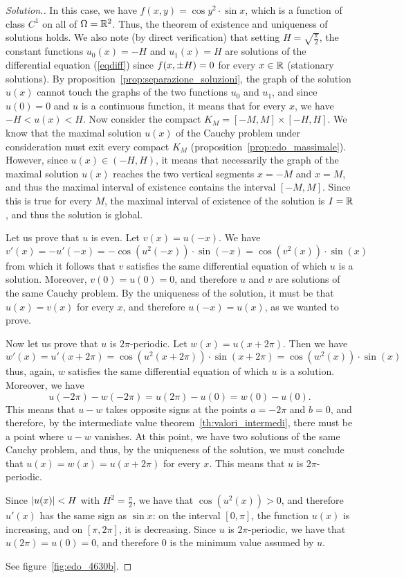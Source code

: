 \begin{proof}[Solution.]
In this case, we have $f(x,y)=\cos y^2\cdot \sin x$, which is a function of
class $C^1$ on all of $\Omega={\mathbb R}^2$. Thus, the theorem of existence and
uniqueness of solutions holds. We also note (by direct verification) that
setting $H=\sqrt{\frac \pi 2}$, the constant functions $u_0(x)=-H$ and
$u_1(x)=H$ are solutions of the differential equation (\ref{eqdiff}) since
$f{\left( x,\pm H \right)}=0$ for every $x\in {\mathbb R}$ (stationary solutions). By
proposition~\ref{prop:separazione_soluzioni}, the graph of the solution $u(x)$
cannot touch the graphs of the two functions $u_0$ and $u_1$, and since $u(0)=0$
and $u$ is a continuous function, it means that for every $x$, we have $-H <
u(x) < H$. Now consider the compact $K_M=[-M,M] \times [-H,H]$. We know that the
maximal solution $u(x)$ of the Cauchy problem under consideration must exit
every compact $K_M$ (proposition~\ref{prop:edo_massimale}). However, since
$u(x)\in (-H,H)$, it means that necessarily the graph of the maximal solution
$u(x)$ reaches the two vertical segments $x=-M$ and $x=M$, and thus the maximal
interval of existence contains the interval $[-M,M]$. Since this is true for
every $M$, the maximal interval of existence of the solution is $I={\mathbb R}$, and
thus the solution is global.

Let us prove that $u$ is even. Let $v(x)=u(-x)$. We have 
\[ 
    v'(x) = -u'(-x) 
    = -\cos(u^2(-x))\cdot \sin(-x) 
    = \cos(v^2(x))\cdot \sin(x)
\]
from which it follows that $v$ satisfies the same differential equation of which
$u$ is a solution. Moreover, $v(0)=u(0)=0$, and therefore $u$ and $v$ are
solutions of the same Cauchy problem. By the uniqueness of the solution, it must
be that $u(x)=v(x)$ for every $x$, and therefore $u(-x)=u(x)$, as we wanted to
prove.

Now let us prove that $u$ is $2\pi$-periodic. Let $w(x)=u(x+2\pi)$. Then we have
\[
  w'(x) = u'(x+2\pi) = \cos(u^2(x+2\pi))\cdot \sin(x+2\pi) 
  = \cos(w^2(x))\cdot \sin(x) 
\]
thus, again, $w$ satisfies the same differential equation of which $u$ is a
solution. Moreover, we have
\[
  u(-2\pi) - w(-2\pi) = u(2\pi) - u(0) = w(0) - u(0).
\]
This means that $u-w$ takes opposite signs at the points $a=-2\pi$ and $b=0$,
and therefore, by the intermediate value theorem~\ref{th:valori_intermedi},
there must be a point where $u-w$ vanishes. At this point, we have two solutions
of the same Cauchy problem, and thus, by the uniqueness of the solution, we must
conclude that $u(x)=w(x)=u(x+2\pi)$ for every $x$. This means that $u$ is $2\pi$-periodic.

Since ${\left|u(x)\right|}<H$ with $H^2=\frac \pi 2$, we have that $\cos(u^2(x))>0$, and
therefore $u'(x)$ has the same sign as $\sin x$: on the interval $[0,\pi]$, the
function $u(x)$ is increasing, and on $[\pi,2\pi]$, it is decreasing. Since $u$
is $2\pi$-periodic, we have that $u(2\pi)=u(0)=0$, and therefore $0$ is the
minimum value assumed by $u$.

See figure~\ref{fig:edo_4630b}.
\end{proof}

